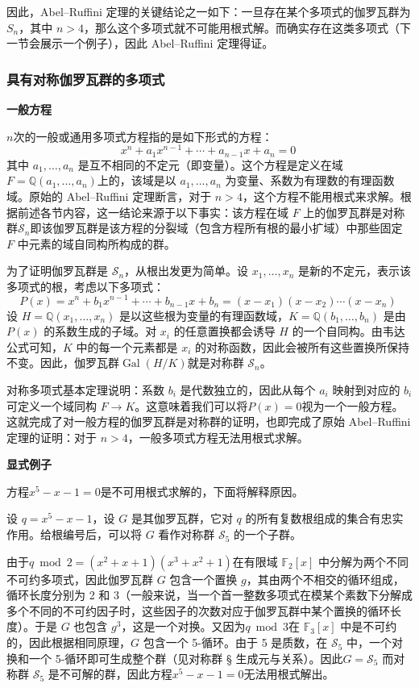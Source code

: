 因此，Abel–Ruffini 定理的关键结论之一如下：一旦存在某个多项式的伽罗瓦群为 $S_n$，其中 $n > 4$，那么这个多项式就不可能用根式解。而确实存在这类多项式（下一节会展示一个例子），因此 Abel–Ruffini 定理得证。
\subsubsection{具有对称伽罗瓦群的多项式}
\textbf{一般方程}

$n$次的一般或通用多项式方程指的是如下形式的方程：
$$
x^n + a_1 x^{n-1} + \cdots + a_{n-1}x + a_n = 0~
$$
其中 $a_1, \ldots, a_n$ 是互不相同的不定元（即变量）。这个方程是定义在域$F = \mathbb{Q}(a_1, \ldots, a_n)$上的，该域是以 $a_1, \ldots, a_n$ 为变量、系数为有理数的有理函数域。原始的 Abel–Ruffini 定理断言，对于 $n > 4$，这个方程不能用根式来求解。根据前述各节内容，这一结论来源于以下事实：该方程在域 $F$ 上的伽罗瓦群是对称群$\mathcal{S}_n$即该伽罗瓦群是该方程的分裂域（包含方程所有根的最小扩域）中那些固定 $F$ 中元素的域自同构所构成的群。

为了证明伽罗瓦群是 $\mathcal{S}_n$，从根出发更为简单。设 $x_1, \ldots, x_n$ 是新的不定元，表示该多项式的根，考虑以下多项式：
$$
P(x) = x^n + b_1 x^{n-1} + \cdots + b_{n-1}x + b_n = (x - x_1)(x - x_2) \cdots (x - x_n)~
$$
设 $H = \mathbb{Q}(x_1, \ldots, x_n)$ 是以这些根为变量的有理函数域，$K = \mathbb{Q}(b_1, \ldots, b_n)$ 是由 $P(x)$ 的系数生成的子域。对 $x_i$ 的任意置换都会诱导 $H$ 的一个自同构。由韦达公式可知，$K$ 中的每一个元素都是 $x_i$ 的对称函数，因此会被所有这些置换所保持不变。因此，伽罗瓦群$\operatorname{Gal}(H / K)$就是对称群 $\mathcal{S}_n$。

对称多项式基本定理说明：系数 $b_i$ 是代数独立的，因此从每个 $a_i$ 映射到对应的 $b_i$ 可定义一个域同构 $F \to K$。这意味着我们可以将$P(x) = 0$视为一个一般方程。这就完成了对一般方程的伽罗瓦群是对称群的证明，也即完成了原始 Abel–Ruffini 定理的证明：对于 $n > 4$，一般多项式方程无法用根式求解。

\textbf{显式例子}

方程$x^5 - x - 1 = 0$是不可用根式求解的，下面将解释原因。

设 $q = x^5 - x - 1$，设 $G$ 是其伽罗瓦群，它对 $q$ 的所有复数根组成的集合有忠实作用。给根编号后，可以将 $G$ 看作对称群 $\mathcal{S}_5$ 的一个子群。

由于$q \bmod 2 = (x^2 + x + 1)(x^3 + x^2 + 1)$在有限域 $\mathbb{F}_2[x]$ 中分解为两个不同不可约多项式，因此伽罗瓦群 $G$ 包含一个置换 $g$，其由两个不相交的循环组成，循环长度分别为 2 和 3（一般来说，当一个首一整数多项式在模某个素数下分解成多个不同的不可约因子时，这些因子的次数对应于伽罗瓦群中某个置换的循环长度）。于是 $G$ 也包含 $g^3$，这是一个对换。又因为$q \bmod 3$在 $\mathbb{F}_3[x]$ 中是不可约的，因此根据相同原理，$G$ 包含一个 5-循环。由于 5 是质数，在 $\mathcal{S}_5$ 中，一个对换和一个 5-循环即可生成整个群（见对称群 § 生成元与关系）。因此$G = \mathcal{S}_5$
而对称群 $\mathcal{S}_5$ 是不可解的群，因此方程$x^5 - x - 1 = 0$无法用根式解出。
